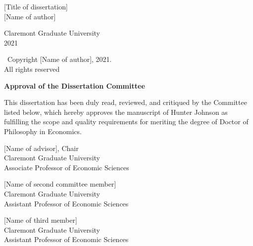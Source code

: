 \documentclass[12pt, letterpage]{article}
\begin{document}


\clearpage
\vspace*{\fill}
\begin{center}
[Title of dissertation] \\[6.5ex]
[Name of author] \\
\end{center}
\vspace*{\fill}
\begin{center}
Claremont Graduate University \\
2021
\end{center}
\clearpage

\clearpage
\onehalfspacing


\clearpage
\vspace*{\fill}
\begin{center}
\textcopyright \ Copyright [Name of author], 2021. \\
All rights reserved
\end{center}

\clearpage
\onehalfspacing


\clearpage
\begin{center}
{\Large\bfseries Approval of the Dissertation Committee} \\[2.5ex]
\end{center}
This dissertation has been duly read, reviewed, and critiqued by the Committee listed below, which hereby approves the manuscript of Hunter Johnson as fulfilling the scope and quality requirements for meriting the degree of Doctor of Philosophy in Economics.
\vspace{\baselineskip}\linebreak
\begin{center}
[Name of advisor], Chair \\
Claremont Graduate University \\
Associate Professor of Economic Sciences \\
\end{center}
\begin{center}
[Name of second committee member] \\
Claremont Graduate University \\
Assistant Professor of Economic Sciences \\
\end{center}
\begin{center}
[Name of third member] \\
Claremont Graduate University \\
Assistant Professor of Economic Sciences \\
\end{center}
\vspace*{\fill}
\end{document}
